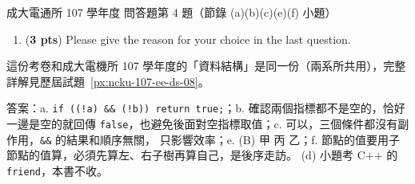 \begin{pastexam}[label={px:ncku-107-cce-08}]{成大電通所 107 學年度 問答題第 4 題（節錄 (a)(b)(c)(e)(f) 小題）}
\begin{enumerate}[label=\alph*.,start=5]
甲、\texttt{PostOrderEval(s->leftChild);}\\
乙、
\begin{verbatim}
switch(s->data) {
  b.1  case Not:   s->value = !s->rightChild->value; break;
  b.2  case And:   s->value = s->leftChild->value && s->rightChild->value; break;
  b.3  case Or:    s->value = s->leftChild->value || s->rightChild->value;; break;
  b.4  case True:  s->value = true; break; // terminal node
  b.5  case False: s->value = false; // terminal node
}
\end{verbatim}
丙、\texttt{PostOrderEval(s->rightChild);}
\item (\textbf{3 pts}) Please give the reason for your choice in the last question.
\end{enumerate}
\end{pastexam}

\begin{pastsoln}
這份考卷和成大電機所 107 學年度的「資料結構」是同一份（兩系所共用），完整詳解見歷屆試題~\ref{px:ncku-107-ee-ds-08}。

答案：a. \texttt{if ((!a) \&\& (!b)) return true;}；b. 確認兩個指標都不是空的，恰好一邊是空的就回傳
\texttt{false}，也避免後面對空指標取值；c. 可以，三個條件都沒有副作用，\texttt{\&\&} 的結果和順序無關，
只影響效率；e. (B) 甲 丙 乙；f. 節點的值要用子節點的值算，必須先算左、右子樹再算自己，是後序走訪。
(d) 小題考 C++ 的 \texttt{friend}，本書不收。
\end{pastsoln}
